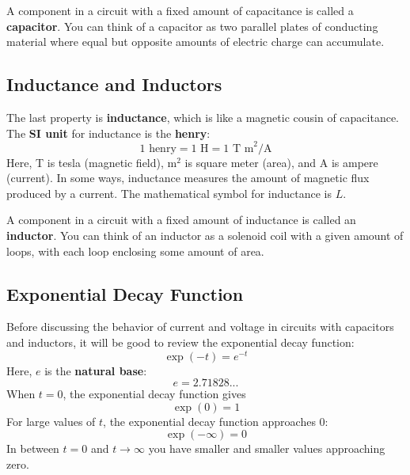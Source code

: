 A component in a circuit with a fixed amount of capacitance is called a \textbf{capacitor}. You can think of a capacitor as two parallel plates of conducting material where equal but opposite amounts of electric charge can accumulate.
\subsection{Inductance and Inductors}
The last property is \textbf{inductance}, which is like a magnetic cousin of capacitance. The \textbf{SI unit} for inductance is the \textbf{henry}:
\begin{equation}
	1 \text{ henry} = 1 \text{ H} = 1 \text{ T m}^{2}\text{/A}
\end{equation}
Here, T is tesla (magnetic field), m$^{2}$ is square meter (area), and A is ampere (current). In some ways, inductance measures the amount of magnetic flux produced by a current. The mathematical symbol for inductance is $L$.

A component in a circuit with a fixed amount of inductance is called an \textbf{inductor}. You can think of an inductor as a solenoid coil with a given amount of loops, with each loop enclosing some amount of area.
\subsection{Exponential Decay Function}
Before discussing the behavior of current and voltage in circuits with capacitors and inductors, it will be good to review the exponential decay function:
\begin{equation}
    \exp(-t) = e^{-t}
\end{equation}
Here, $e$ is the \textbf{natural base}:
\begin{equation}
    e = 2.71828...
\end{equation}
When $t = 0$, the exponential decay function gives
\begin{equation}
    \exp(0) = 1
\end{equation}
For large values of $t$, the exponential decay function approaches 0:
\begin{equation}
    \exp(-\infty) = 0
\end{equation}
In between $t = 0$ and $t \rightarrow \infty$ you have smaller and smaller values approaching zero.

